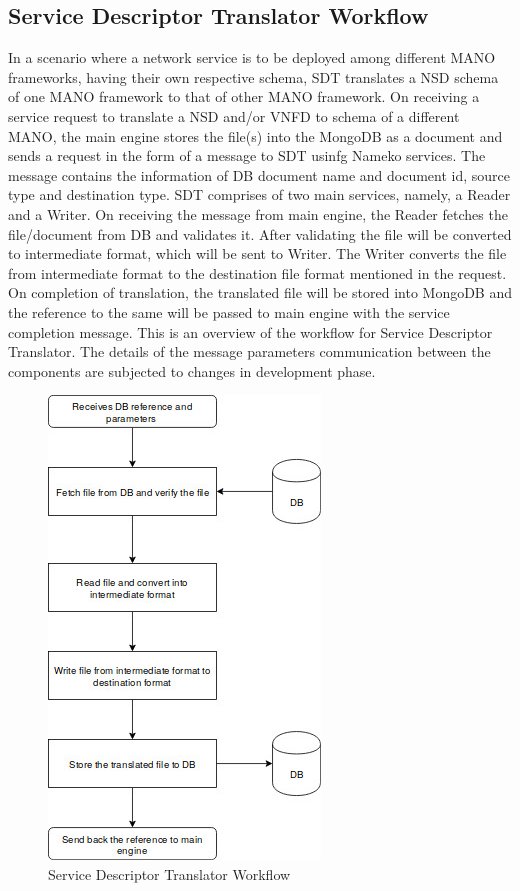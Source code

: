 \subsection{Service Descriptor Translator Workflow}
In a scenario where a network service is to be deployed among different MANO frameworks, having their own respective schema, SDT translates a NSD schema of one MANO framework to that of other MANO framework.
On receiving a service request to translate a NSD and/or VNFD to schema of a different MANO, the main engine stores the file(s) into the MongoDB as a document and sends a request in the form of a message to SDT usinfg Nameko services. The message contains the information of DB document name and document id, source type and destination type. 
SDT comprises of two main services, namely, a Reader and a Writer. On receiving the message from main engine, the Reader fetches the file/document from DB and validates it. After validating the file will be converted to intermediate format, which will be sent to Writer. The Writer converts the file from intermediate format to the destination file format mentioned in the request. On completion of translation, the translated file will be stored into MongoDB and the reference to the same will be passed to main engine with the service completion message.
This is an overview of the workflow for Service Descriptor Translator. The details of the message parameters communication between the components are subjected to changes in development phase.
\begin{figure}[H]
	\centering
	\includegraphics[width=0.5\linewidth]{figures/SDT_Workflow}
	\caption{Service Descriptor Translator Workflow}
	\label{fig:SDT Workflow}
\end{figure}

   





